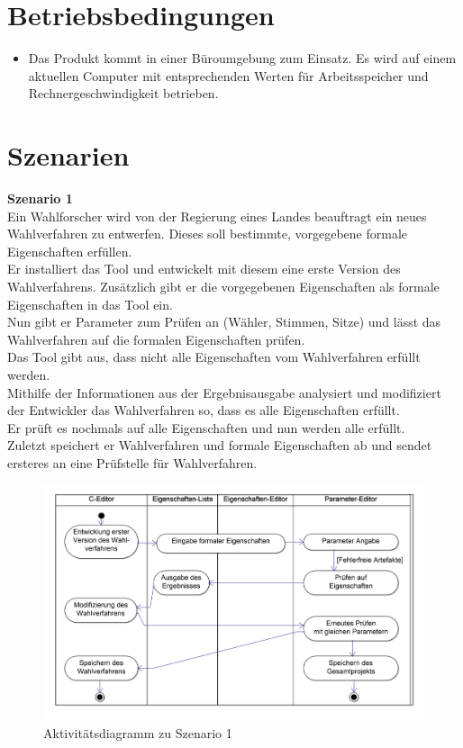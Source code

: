 \documentclass[a4paper]{scrreprt}
\begin{document}
\section{Betriebsbedingungen}
\begin{itemize}
\item Das Produkt kommt in einer Büroumgebung zum Einsatz. Es wird auf einem
aktuellen Computer mit entsprechenden Werten für Arbeitsspeicher und Rechnergeschwindigkeit betrieben.
\end{itemize}

\section{Szenarien}
\textbf{Szenario 1}\\
Ein Wahlforscher wird von der Regierung eines Landes beauftragt ein neues Wahlverfahren zu entwerfen. Dieses soll bestimmte, vorgegebene formale Eigenschaften erfüllen.\\
Er installiert das Tool und entwickelt mit diesem eine erste Version des Wahlverfahrens. Zusätzlich gibt er die vorgegebenen Eigenschaften als formale Eigenschaften in das Tool ein.\\
Nun gibt er Parameter zum Prüfen an (Wähler, Stimmen, Sitze) und lässt das Wahlverfahren auf die formalen Eigenschaften prüfen.\\
Das Tool gibt aus, dass nicht alle Eigenschaften vom Wahlverfahren erfüllt werden.\\
Mithilfe der Informationen aus der Ergebnisausgabe analysiert und modifiziert der Entwickler das Wahlverfahren so, dass es alle Eigenschaften erfüllt.\\
Er prüft es nochmals auf alle Eigenschaften und nun werden alle erfüllt.\\
Zuletzt speichert er Wahlverfahren und formale Eigenschaften ab und sendet ersteres an eine Prüfstelle für Wahlverfahren.

\begin{figure}[H]
\hspace{-1cm}
\includegraphics[scale=0.12]{ActivityDiagramScenario1.png}
\caption{Aktivitätsdiagramm zu Szenario 1}
\label{Packet-scetch}
\end{figure}
\end{document}
